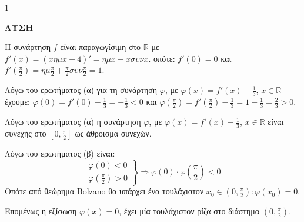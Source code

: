 \begin{ylh}{1}
    \item [Ύλη από εικόνα]
\end{ylh}
\textbf{ΛΥΣΗ}
\begin{alist}
    \item Η συνάρτηση $f$ είναι παραγωγίσιμη στο $\mathbb{R}$ με $f'(x) = (x\eta\mu x + 4)' = \eta\mu x + x\sigma\upsilon\nu x$.
    οπότε: $f'(0) = 0$ και $f'\left(\frac{\pi}{2}\right) = \eta\mu\frac{\pi}{2} + \frac{\pi}{2}\sigma\upsilon\nu\frac{\pi}{2} = 1$.
    \item Λόγω του ερωτήματος (α) για τη συνάρτηση $\varphi$, με $\varphi(x) = f'(x) - \frac{1}{3}$, $x \in \mathbb{R}$
    έχουμε: $\varphi(0) = f'(0) - \frac{1}{3} = -\frac{1}{3} < 0$ και $\varphi\left(\frac{\pi}{2}\right) = f'\left(\frac{\pi}{2}\right) - \frac{1}{3} = 1 - \frac{1}{3} = \frac{2}{3} > 0$.
    \item Λόγω του ερωτήματος (α) η συνάρτηση $\varphi$, με $\varphi(x) = f'(x) - \frac{1}{3}$, $x \in \mathbb{R}$ είναι
    συνεχής στο $\left[0, \frac{\pi}{2}\right]$ ως άθροισμα συνεχών.
    
    Λόγω του ερωτήματος (β) είναι:
    \[ \left. \begin{array}{l} \varphi(0) < 0 \\ \varphi\left(\frac{\pi}{2}\right) > 0 \end{array} \right\} \Rightarrow \varphi(0) \cdot \varphi\left(\frac{\pi}{2}\right) < 0 \]
    Οπότε από θεώρημα Bolzano θα υπάρχει ένα τουλάχιστον $x_0 \in \left(0, \frac{\pi}{2}\right): \varphi(x_0) = 0$.
    
    Επομένως η εξίσωση $\varphi(x) = 0$, έχει μία τουλάχιστον ρίζα στο διάστημα $\left(0, \frac{\pi}{2}\right)$.
\end{alist}